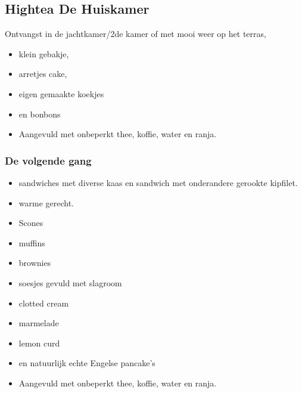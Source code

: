 \subsection{Hightea De Huiskamer}Ontvangst in de jachtkamer/2de kamer  of met mooi weer op het terras,
\begin{itemize} 
\item klein gebakje,
\item  arretjes cake,  
\item eigen gemaakte  koekjes 
\item en bonbons\\
\item Aangevuld met onbeperkt thee,  koffie, water en ranja.
\end{itemize} 

\subsubsection*{De volgende gang}

\begin{itemize} 
\item   sandwiches met diverse  kaas en sandwich met onderandere  gerookte kipfilet.
\item   warme gerecht.
\item   Scones
\item   muffins
\item  brownies
\item  soesjes gevuld met slagroom 
\item  clotted cream 
\item  marmelade
\item  lemon curd
\item  en natuurlijk echte Engelse pancake’s\\

\item Aangevuld met onbeperkt thee,  koffie, water en ranja.
\end{itemize} 

